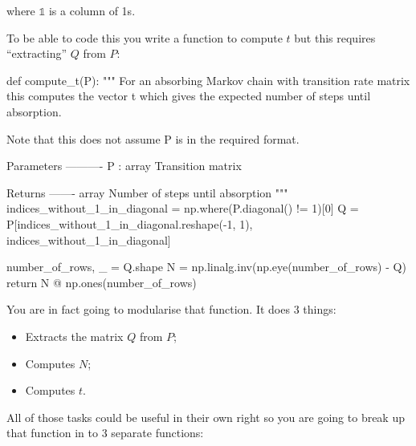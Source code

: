 where \(\mathbb{1}\) is a column of 1s.


To be able to code this you write a function to compute \(t\) but this
requires ``extracting'' \(Q\) from \(P\):




\begin{python}
def compute_t(P):
    """
    For an absorbing Markov chain with transition rate matrix this computes the
    vector t which gives the expected number of steps until absorption.

    Note that this does not assume P is in the required format.

    Parameters
    ----------
    P : array
        Transition matrix

    Returns
    -------
    array
        Number of steps until absorption
    """
    indices_without_1_in_diagonal = np.where(P.diagonal() != 1)[0]
    Q = P[indices_without_1_in_diagonal.reshape(-1, 1), indices_without_1_in_diagonal]

    number_of_rows, _ = Q.shape
    N = np.linalg.inv(np.eye(number_of_rows) - Q)
    return N @ np.ones(number_of_rows)
\end{python}





You are in fact going to modularise that function. It does 3 things:
\begin{itemize}
\item 

Extracts the matrix \(Q\) from \(P\);

\item 

Computes \(N\);

\item 

Computes \(t\).

\end{itemize}


All of those tasks could be useful in their own right so you are going to break
up that function in to 3 separate functions:




